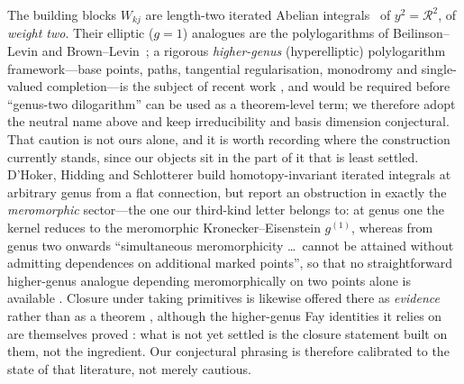 \documentclass[12pt]{iopart}
\theoremstyle{plain}
\theoremstyle{definition}
\theoremstyle{remark}
\begin{document}
The building blocks $W_{kj}$ are length-two iterated Abelian
integrals~\cite{Chen1977} of $y^2=\mathcal{R}^2$, of \emph{weight two}. Their elliptic
($g{=}1$) analogues are the polylogarithms of Beilinson--Levin and
Brown--Levin~\cite{BeilinsonLevin1994,BrownLevin2011}; a rigorous \emph{higher-genus}
(hyperelliptic) polylogarithm framework---base points, paths, tangential
regularisation, monodromy and single-valued completion---is the subject of recent work
\cite{BauneEtal2024,DHokerSchlotterer2024,DHokerHiddingSchlotterer2025,DHokerEnriquezSchlottererZerbini2026},
and would be required before ``genus-two
dilogarithm'' can be used as a theorem-level term; we therefore adopt the neutral name
above and keep irreducibility and basis dimension conjectural. That caution is not
ours alone, and it is worth recording where the construction currently stands,
since our objects sit in the part of it that is least settled. D'Hoker, Hidding and
Schlotterer build homotopy-invariant iterated integrals at arbitrary genus from a
flat connection, but report an obstruction in exactly the \emph{meromorphic}
sector---the one our third-kind letter belongs to: at genus one the kernel reduces
to the meromorphic Kronecker--Eisenstein $g^{(1)}$, whereas from genus two onwards
``simultaneous meromorphicity \dots\ cannot be attained without admitting
dependences on additional marked points'', so that no straightforward higher-genus
analogue depending meromorphically on two points alone is available
\cite[\S4.5]{DHokerHiddingSchlotterer2025}. Closure under taking primitives is
likewise offered there as \emph{evidence} rather than as a theorem
\cite[\S4.6]{DHokerHiddingSchlotterer2025}, although the higher-genus Fay
identities it relies on are themselves proved
\cite[\S5]{DHokerSchlotterer2024}: what is not yet settled is the closure
statement built on them, not the ingredient. Our conjectural phrasing is therefore
calibrated to the state of that literature, not merely cautious.
\end{document}
